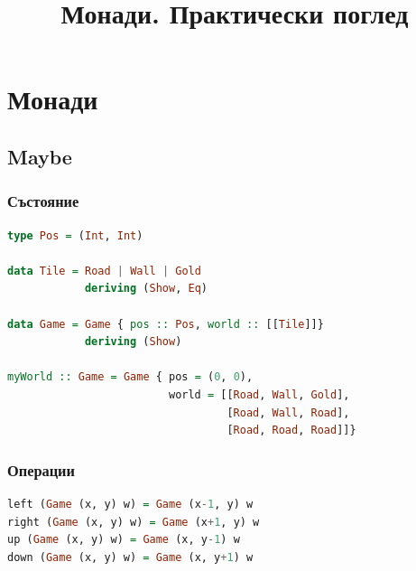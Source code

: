 \documentclass{beamer}
\begin{document}
\title[Монади]{Монади. Практически поглед}
\frame{\titlepage}

\section{Монади}
\subsection{Maybe}


\begin{frame}[fragile]
  \frametitle{Състояние}

\begin{lstlisting}[language=Haskell]
type Pos = (Int, Int)
  
data Tile = Road | Wall | Gold
            deriving (Show, Eq)
  
data Game = Game { pos :: Pos, world :: [[Tile]]}
            deriving (Show)
  
myWorld :: Game = Game { pos = (0, 0), 
                         world = [[Road, Wall, Gold], 
                                  [Road, Wall, Road], 
                                  [Road, Road, Road]]}
\end{lstlisting}


\end{frame}


\begin{frame}[fragile]
  \frametitle{Операции}

\begin{lstlisting}[language=Haskell]
left (Game (x, y) w) = Game (x-1, y) w
right (Game (x, y) w) = Game (x+1, y) w
up (Game (x, y) w) = Game (x, y-1) w
down (Game (x, y) w) = Game (x, y+1) w
\end{lstlisting}

\end{frame}
\end{document}
